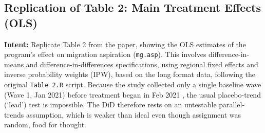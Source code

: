 \documentclass[
]{article}
\begin{document}
\subsection{Replication of Table 2: Main Treatment Effects
(OLS)}\label{replication-of-table-2-main-treatment-effects-ols}

\textbf{Intent:} Replicate Table 2 from the paper, showing the OLS
estimates of the program's effect on migration aspiration
(\texttt{mg.asp}). This involves difference-in-means and
difference-in-differences specifications, using regional fixed effects
and inverse probability weights (IPW), based on the long format data,
following the original \texttt{Table\ 2.R} script. Because the study
collected only a single baseline wave (Wave 1, Jan 2021) before
treatment began in Feb 2021 , the usual placebo-trend (`lead') test is
impossible. The DiD therefore rests on an untestable parallel-trends
assumption, which is weaker than ideal even though assignment was
random, food for thought.
\end{document}

